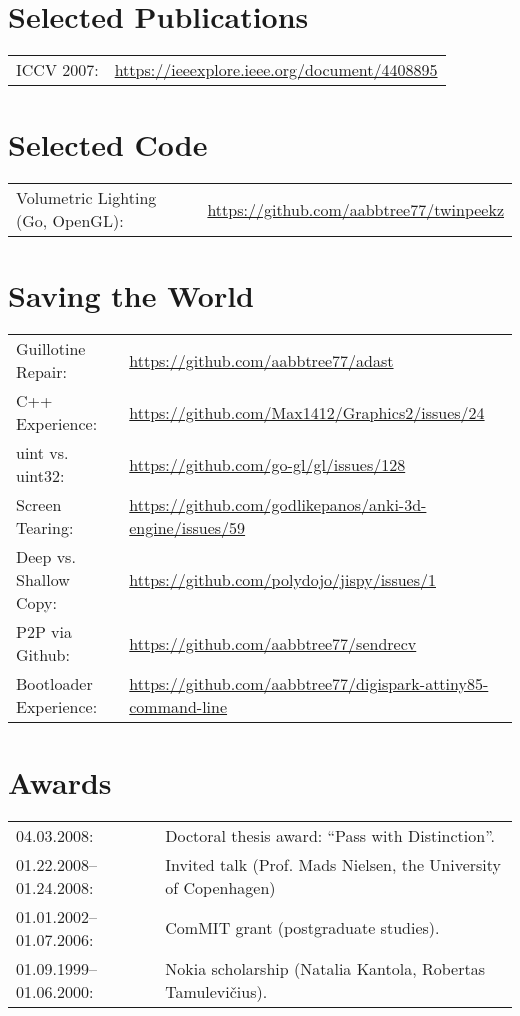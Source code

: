 \documentclass[a4paper,11pt]{article}
\begin{document}
\section*{Selected Publications}
\label{sect:pubs}

\begin{tabular}{ll}
ICCV 2007:& \url{https://ieeexplore.ieee.org/document/4408895}
\end{tabular}


%
\section*{Selected Code}
\begin{tabular}{ll}
Volumetric Lighting (Go, OpenGL): & \url{https://github.com/aabbtree77/twinpeekz}\\
\end{tabular}

%
\section*{Saving the World}
\begin{tabular}{ll}
Guillotine Repair: & \url{https://github.com/aabbtree77/adast}\\
C++ Experience: & \url{https://github.com/Max1412/Graphics2/issues/24}\\
uint vs. uint32: & \url{https://github.com/go-gl/gl/issues/128}\\
Screen Tearing: & \url{https://github.com/godlikepanos/anki-3d-engine/issues/59}\\
Deep vs. Shallow Copy: & \url{https://github.com/polydojo/jispy/issues/1}\\
P2P via Github: & \url{https://github.com/aabbtree77/sendrecv}\\
Bootloader Experience: & \url{https://github.com/aabbtree77/digispark-attiny85-command-line}\\
\end{tabular}

%
%
\section*{Awards}
%
\begin{tabular}{ll}
        04.03.2008: & Doctoral thesis award: “Pass with Distinction”.\\
        01.22.2008--01.24.2008: & Invited talk (Prof. Mads Nielsen, the University of Copenhagen)\\
        01.01.2002--01.07.2006:& ComMIT grant (postgraduate studies).\\
        01.09.1999--01.06.2000:& Nokia scholarship (Natalia Kantola, Robertas Tamulevi\v{c}ius).
\end{tabular}
%
%

\end{document}
